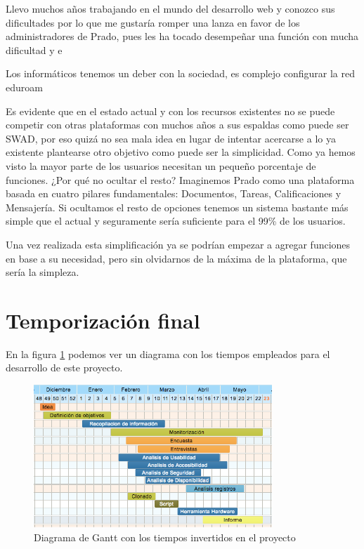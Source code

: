 Llevo muchos años trabajando en el mundo del desarrollo web y conozco sus dificultades por lo que me gustaría romper una lanza en favor de los administradores de Prado, pues  les ha tocado desempeñar una función con mucha dificultad y e


Los informáticos tenemos un deber con la sociedad, es complejo configurar la red eduroam


Es evidente que en el estado actual y con los recursos existentes no se puede competir con otras plataformas con muchos años a sus espaldas como puede ser SWAD, por eso quizá no sea mala idea en lugar de intentar acercarse a lo ya existente plantearse otro objetivo como puede ser la simplicidad. Como ya hemos visto la mayor parte de los usuarios necesitan un pequeño porcentaje de funciones. ¿Por qué no ocultar el resto? Imaginemos Prado como una plataforma basada en cuatro pilares fundamentales: Documentos, Tareas, Calificaciones y Mensajería. Si ocultamos el resto de opciones tenemos un sistema bastante más simple que el actual y seguramente sería suficiente para el 99\% de los usuarios.

Una vez realizada esta simplificación ya se podrían empezar a agregar funciones en base a su necesidad, pero sin olvidarnos de la máxima de la plataforma, que sería la simpleza. 


\section{Temporización final}

En la figura \ref{fig:temporizacion2} podemos ver un diagrama con los tiempos empleados para el desarrollo de este proyecto. 

\begin{figure}[H]
\centering
\includegraphics[width=0.8\textwidth]{../screenshots/temporizacion2}
\caption{Diagrama de Gantt con los tiempos invertidos en el proyecto}
\label{fig:temporizacion2}
\end{figure}

